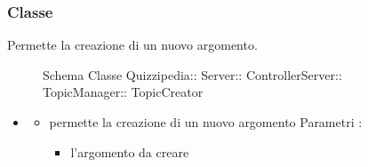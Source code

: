 \subsubsection{Classe }
Permette la creazione di un nuovo argomento.
\begin{figure}[H]
\centering
\noindent{}
\caption[Schema Classe TopicCreator]{Schema Classe Quizzipedia:: Server:: ControllerServer:: TopicManager:: TopicCreator}
\end{figure}
\begin{itemize}
\item {}
\begin{itemize}
\item {}
\newline
permette la creazione di un nuovo argomento
\newline
Parametri :
\begin{itemize}
\item {}
\newline
l'argomento da creare
\end{itemize}
\end{itemize}
\end{itemize}
